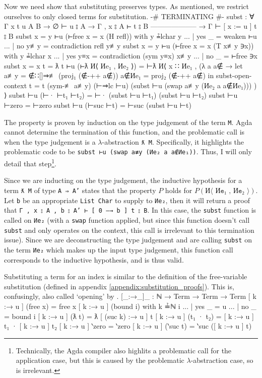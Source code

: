 \documentclass[logo,bsc,singlespacing,parskip,online]{infthesis}
\renewenvironment{code}{\mintedcopy[breaklines,breaksymbolleft=\;]{agda}}{\endmintedcopy}
\begin{document}
Now we need show that substituting preserves types. As mentioned, we restrict ourselves to only
closed terms for substitution.
\begin{code}
  {-# TERMINATING #-}
  subst : ∀ {Γ x t u A B}
    → ∅ ⊢ u ⦂ A
    → Γ , x ⦂ A ⊢ t ⦂ B
      --------------------
    → Γ ⊢ [ x := u ] t ⦂ B
  subst {x = y} ⊢u (⊢free {x = x} (H refl)) with y ≟lchar y
  ... | yes _   = weaken ⊢u
  ... | no  y≢y = contradiction refl y≢y
  subst {x = y} ⊢u (⊢free {x = x} (T x≢y ∋x)) with y ≟lchar x
  ... | yes y≡x = contradiction (sym y≡x) x≢y
  ... | no  _   = ⊢free ∋x
  subst {x = x} {t = ƛ t} ⊢u (⊢ƛ И⟨ Иe₁ , Иe₂ ⟩) =
    ⊢ƛ И⟨ x ∷ Иe₁
        , (λ a {a∉} →
          let a≢y   = ∉∷[]⇒≢ (proj₁ (∉-++ a∉))
              a∉Иe₁ = proj₂ (∉-++ a∉)
          in subst-open-context
            {t = t}
            (sym-≢ a≢y)
            (⊢⇒lc ⊢u)
            (subst ⊢u (swap a≢y (Иe₂ a {a∉Иe₁}))) )
        ⟩
  subst ⊢u (⊢· ⊢t₁ ⊢t₂) = ⊢· (subst ⊢u ⊢t₁) (subst ⊢u ⊢t₂)
  subst ⊢u ⊢zero = ⊢zero
  subst ⊢u (⊢suc ⊢t) = ⊢suc (subst ⊢u ⊢t)
\end{code}

The property is proven by induction on the type judgement of the term \texttt{M}. Agda cannot
determine the termination of this function, and the problematic call is when the type judgement is a
$\lambda$-abstraction \texttt{ƛ M}. Specifically, it highlights the problematic code to be
\texttt{subst ⊢u (swap a≢y (Иe₂ a {a∉Иe₁}))}. Thus, I will only detail that
step\footnote{Technically, the Agda compiler also highlits a problematic call for the application
case, but this is caused by the problematic $\lambda$-abstraction case, so is irrelevant.}.

Since we are inducting on the type judgement, the inductive hypothesis for a term \texttt{ƛ M} of
type \texttt{A ⇒ A'} states that the property $P$ holds for $P(\texttt{И⟨ Иe₁ , Иe₂ ⟩})$. Let
\texttt{b} be an appropriate \texttt{List Char} to supply to \texttt{Иe₂}, then it will return a
proof that \texttt{Γ , x ⦂ A , b ⦂ A' ⊢ [ 0 —→ b ] t ⦂ B}. In this case, the \texttt{subst} function
is called on \texttt{Иe₂} (with a \texttt{swap} function applied, but since this function doesn't
call \texttt{subst} and only operates on the context, this call is irrelevant to this termination
issue). Since we are deconstructing the type judgement and are calling \texttt{subst} on the term
\texttt{Иe₂} which makes up the input type judgement, this function call corresponds to the
inductive hypothesis, and is thus valid.

Substituting a term for an index is similar to the definition of the free-variable substitution
(defined in appendix \ref{appendix:substitution_proofs}). This is, confusingly, also called
`opening' by \citet{chargueraud_locally_2012}.
\begin{code}
  [_:→_]_ : ℕ → Term → Term → Term
  [ k :→ u ] (free x) = free x
  [ k :→ u ] (bound i) with k ≟ℕ i
  ... | yes _ = u
  ... | no  _ = bound i
  [ k :→ u ] (ƛ t) = ƛ [ (suc k) :→ u ] t
  [ k :→ u ] (t₁ · t₂) = [ k :→ u ] t₁ · [ k :→ u ] t₂
  [ k :→ u ] ‵zero = ‵zero
  [ k :→ u ] (‵suc t) = ‵suc ([ k :→ u ] t)
\end{code}
\end{document}
